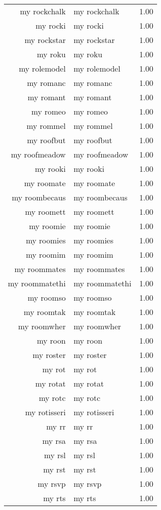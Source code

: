 \begin{table}[ht]
\begin{tabular}{rlr}
  my rockchalk & my rockchalk & 1.00 \\ 
  my rocki & my rocki & 1.00 \\ 
  my rockstar & my rockstar & 1.00 \\ 
  my roku & my roku & 1.00 \\ 
  my rolemodel & my rolemodel & 1.00 \\ 
  my romanc & my romanc & 1.00 \\ 
  my romant & my romant & 1.00 \\ 
  my romeo & my romeo & 1.00 \\ 
  my rommel & my rommel & 1.00 \\ 
  my roofbut & my roofbut & 1.00 \\ 
  my roofmeadow & my roofmeadow & 1.00 \\ 
  my rooki & my rooki & 1.00 \\ 
  my roomate & my roomate & 1.00 \\ 
  my roombecaus & my roombecaus & 1.00 \\ 
  my roomett & my roomett & 1.00 \\ 
  my roomie & my roomie & 1.00 \\ 
  my roomies & my roomies & 1.00 \\ 
  my roomim & my roomim & 1.00 \\ 
  my roommates & my roommates & 1.00 \\ 
  my roommatethi & my roommatethi & 1.00 \\ 
  my roomso & my roomso & 1.00 \\ 
  my roomtak & my roomtak & 1.00 \\ 
  my roomwher & my roomwher & 1.00 \\ 
  my roon & my roon & 1.00 \\ 
  my roster & my roster & 1.00 \\ 
  my rot & my rot & 1.00 \\ 
  my rotat & my rotat & 1.00 \\ 
  my rotc & my rotc & 1.00 \\ 
  my rotisseri & my rotisseri & 1.00 \\ 
  my rr & my rr & 1.00 \\ 
  my rsa & my rsa & 1.00 \\ 
  my rsl & my rsl & 1.00 \\ 
  my rst & my rst & 1.00 \\ 
  my rsvp & my rsvp & 1.00 \\ 
  my rts & my rts & 1.00 \\ 

\end{tabular}
\end{table}
